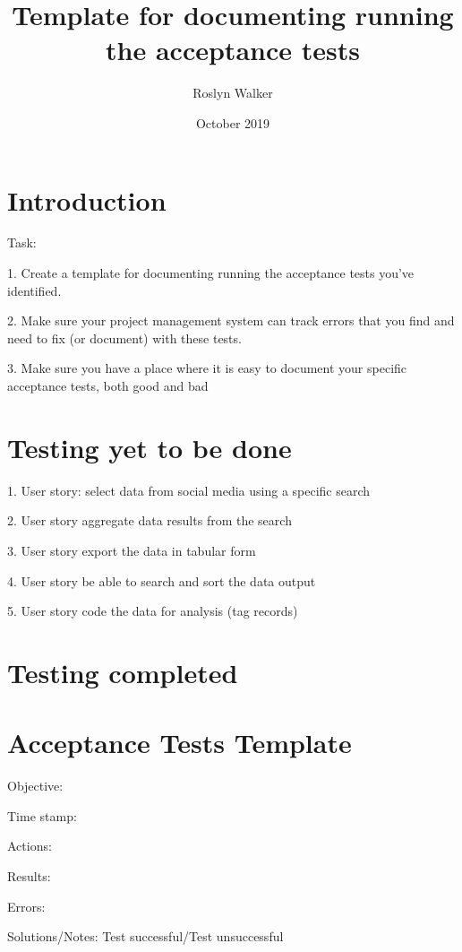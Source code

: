 \documentclass{article}
\title{Template for documenting running the acceptance tests}
\author{Roslyn Walker }
\date{October 2019}
\begin{document}
\maketitle

\section{Introduction}
Task:

1. Create a template for documenting running the acceptance tests you’ve identified. 

2. Make sure your project management system can track errors that you find and need to fix (or document) with these tests.

3. Make sure you have a place where it is easy to document your specific acceptance tests, both good and bad


\section {Testing yet to be done}
1. User story: select data from social media using a specific search

2. User story aggregate data results from the search

3. User story export the data in tabular form

4. User story be able to search and sort the data output

5. User story code the data for analysis (tag records)




\section {Testing completed}


\section {Acceptance Tests Template}
Objective:

Time stamp: 

Actions: 

Results:

Errors: 

Solutions/Notes: Test successful/Test unsuccessful
\end{document}
